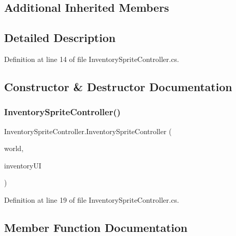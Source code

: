 \subsection*{Additional Inherited Members}


\subsection{Detailed Description}


Definition at line 14 of file Inventory\+Sprite\+Controller.\+cs.



\subsection{Constructor \& Destructor Documentation}
\mbox{\label{class_inventory_sprite_controller_a3e3441ca5794b786c704a9239ec87060}} 
\subsubsection{\texorpdfstring{Inventory\+Sprite\+Controller()}{InventorySpriteController()}}
{\footnotesize\ttfamily Inventory\+Sprite\+Controller.\+Inventory\+Sprite\+Controller (\begin{DoxyParamCaption}\item[{\hyperlink{class_world}{World}}]{world,  }\item[{Game\+Object}]{inventory\+UI }\end{DoxyParamCaption})}



Definition at line 19 of file Inventory\+Sprite\+Controller.\+cs.



\subsection{Member Function Documentation}
\mbox{\label{class_inventory_sprite_controller_ae0423c7f809accb92f9c42a155b0ae45}} 
